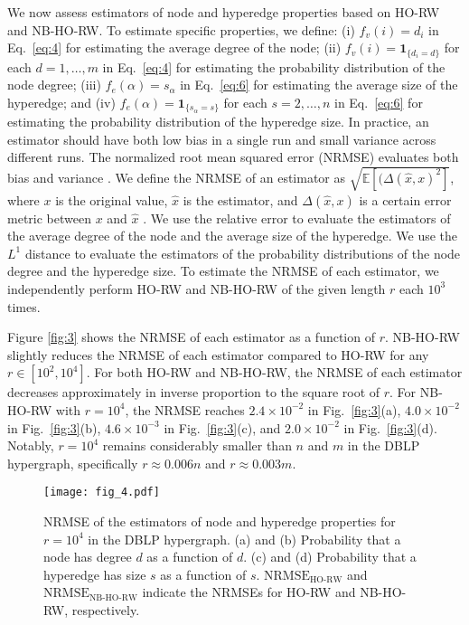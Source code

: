 We now assess estimators of node and hyperedge properties based on HO-RW and NB-HO-RW.
To estimate specific properties, we define:
(i) $f_{v}(i) = d_i$ in Eq.~\eqref{eq:4} for estimating the average degree of the node; (ii) $f_{v}(i) = \bm{1}_{\{d_{i} = d\}}$ for each $d = 1, \ldots, m$ in Eq.~\eqref{eq:4} for estimating the probability distribution of the node degree;
(iii) $f_{e}(\alpha) = s_{\alpha}$ in Eq.~\eqref{eq:6} for estimating the average size of the hyperedge; and
(iv) $f_{e}(\alpha) = \bm{1}_{\{s_{\alpha} = s\}}$ for each $s = 2, \ldots, n$ in Eq.~\eqref{eq:6} for estimating the probability distribution of the hyperedge size.
In practice, an estimator should have both low bias in a single run and small variance across different runs.  
The normalized root mean squared error (NRMSE) evaluates both bias and variance \cite{ribeiro2010, lee2012, hardiman2013, chen2016, nakajima2023}.  
We define the NRMSE of an estimator as $\sqrt{\mathbb{E}[(\Delta(\hat{x}, x)^2]}$, where $x$ is the original value, $\hat{x}$ is the estimator, and $\Delta(\hat{x}, x)$ is a certain error metric between $x$ and $\hat{x}$ \cite{nakajima2023}.
We use the relative error to evaluate the estimators of the average degree of the node and the average size of the hyperedge. 
We use the $L^1$ distance to evaluate the estimators of the probability distributions of the node degree and the hyperedge size.
To estimate the NRMSE of each estimator, we independently perform HO-RW and NB-HO-RW of the given length $r$ each $10^3$ times.

Figure \ref{fig:3} shows the NRMSE of each estimator as a function of $r$.
NB-HO-RW slightly reduces the NRMSE of each estimator compared to HO-RW for any $r \in [10^2, 10^4]$.
For both HO-RW and NB-HO-RW, the NRMSE of each estimator decreases approximately in inverse proportion to the square root of $r$.
For NB-HO-RW with $r = 10^4$, the NRMSE reaches $2.4 \times 10^{-2}$ in Fig.~\ref{fig:3}(a), $4.0 \times 10^{-2}$ in Fig.~\ref{fig:3}(b), $4.6 \times 10^{-3}$ in Fig.~\ref{fig:3}(c), and $2.0 \times 10^{-2}$ in Fig.~\ref{fig:3}(d).
Notably, $r = 10^4$ remains considerably smaller than $n$ and $m$ in the DBLP hypergraph, specifically $r \approx 0.006 n$ and $r \approx 0.003 m$.

\begin{figure}[t]
    \centering
    \texttt{[image: fig\_4.pdf]}\\
    \caption{NRMSE of the estimators of node and hyperedge properties for $r = 10^4$ in the DBLP hypergraph. (a) and (b) Probability that a node has degree $d$ as a function of $d$. (c) and (d) Probability that a hyperedge has size $s$ as a function of $s$. $\text{NRMSE}_{\text{HO-RW}}$ and $\text{NRMSE}_{\text{NB-HO-RW}}$ indicate the NRMSEs for HO-RW and NB-HO-RW, respectively.}
\label{fig:4}
\end{figure}

